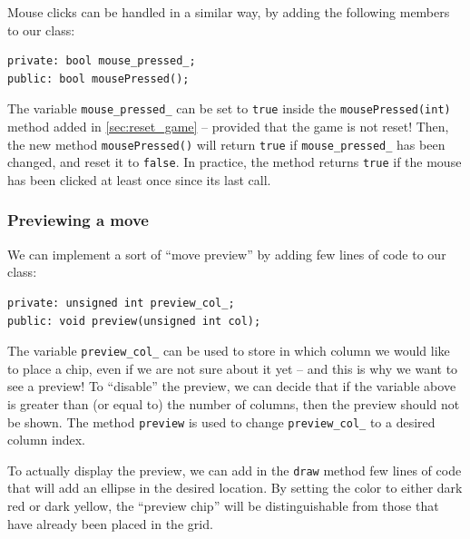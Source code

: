\documentclass{article}
\begin{document}
Mouse clicks can be handled in a similar way, by adding the following members to our class:
\begin{center}
\begin{minipage}{.9\textwidth}
\begin{lstlisting}[style=mycpp,numbers=none]
private: bool mouse_pressed_;
public: bool mousePressed();
\end{lstlisting}
\end{minipage}
\end{center}
The variable \texttt{mouse\string_pressed\string_} can be set to \texttt{true} inside the \texttt{mousePressed(int)} method added in \cref{sec:reset_game} -- provided that the game is not reset! Then, the new method \texttt{mousePressed()} will return \texttt{true} if \texttt{mouse\string_pressed\string_} has been changed, and reset it to \texttt{false}. In practice, the method returns \texttt{true} if the mouse has been clicked at least once since its last call.


\subsubsection{Previewing a move}

We can implement a sort of ``move preview'' by adding few lines of code to our class:
\begin{center}
\begin{minipage}{.9\textwidth}
\begin{lstlisting}[style=mycpp,numbers=none]
private: unsigned int preview_col_;
public: void preview(unsigned int col);
\end{lstlisting}
\end{minipage}
\end{center}
The variable \texttt{preview\string_col\string_} can be used to store in which column we would like to place a chip, even if we are not sure about it yet -- and this is why we want to see a preview! To ``disable'' the preview, we can decide that if the variable above is greater than (or equal to) the number of columns, then the preview should not be shown. The method \texttt{preview} is used to change \texttt{preview\string_col\string_} to a desired column index.

To actually display the preview, we can add in the \texttt{draw} method few lines of code that will add an ellipse in the desired location. By setting the color to either dark red or dark yellow, the ``preview chip'' will be distinguishable from those that have already been placed in the grid.
\end{document}
